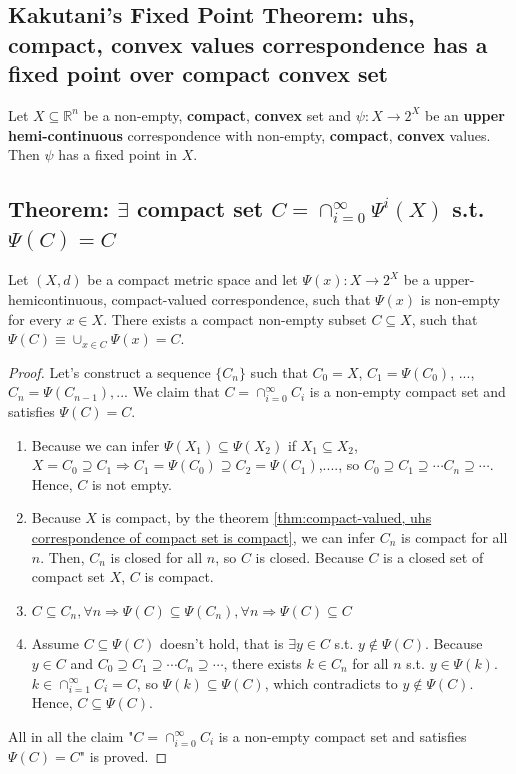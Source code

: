 \documentclass[11pt]{elegantbook}
\begin{document}
\subsection{Kakutani's Fixed Point Theorem: uhs, compact, convex values correspondence has a fixed point over compact convex set}
\begin{theorem}\label{thm:Kakutani's Fixed Point Theorem}
    Let $X \subseteq \mathbb{R}^n$ be a non-empty, \textbf{compact}, \textbf{convex} set and $\psi : X \rightarrow 2^X$ be an \textbf{upper hemi-continuous} correspondence with non-empty, \textbf{compact}, \textbf{convex} values. Then $\psi$ has a fixed point in $X$.
\end{theorem}


\subsection{Theorem: $\exists$ compact set $C = \cap_{i=0}^\infty \Psi^i(X)$ s.t. $\Psi(C)=C$}
\begin{theorem}
    Let $(X, d)$ be a compact metric space and let $\Psi(x) : X \rightarrow 2^X$ be a upper-hemicontinuous, compact-valued correspondence, such that $\Psi(x)$ is non-empty for every $x \in X$. There exists a compact non-empty subset $C\subseteq X$, such that $\Psi(C) \equiv \cup_{x\in C}\Psi(x) = C$.
\end{theorem}
\begin{proof}
    Let's construct a sequence $\{C_n\}$ such that $C_0=X$, $C_1=\Psi(C_0)$, ..., $C_n=\Psi(C_{n-1}),...$ We claim that $C=\cap_{i=0}^\infty C_i$ is a non-empty compact set and satisfies $\Psi(C)=C$.
    \begin{enumerate}
        \item Because we can infer $\Psi(X_1)\subseteq \Psi(X_2)$ if $X_1\subseteq X_2$, $X=C_0\supseteq C_1 \Rightarrow C_1=\Psi(C_0)\supseteq C_2=\Psi(C_1)$,...., so $C_0\supseteq C_1\supseteq \cdots C_n\supseteq \cdots$. Hence, $C$ is not empty.
        \item Because $X$ is compact, by the theorem \ref{thm:compact-valued, uhs correspondence of compact set is compact}, we can infer $C_n$ is compact for all $n$. Then, $C_n$ is closed for all $n$, so $C$ is closed. Because $C$ is a closed set of compact set $X$, $C$ is compact.
        \item $C\subseteq C_n,\forall n \Rightarrow \Psi(C)\subseteq \Psi(C_n),\forall n \Rightarrow \Psi(C)\subseteq C$
        \item Assume $C\subseteq \Psi(C)$ doesn't hold, that is $\exists y\in C$ s.t. $y\notin \Psi(C)$. Because $y\in C$ and $C_0\supseteq C_1\supseteq \cdots C_n\supseteq \cdots$, there exists $k\in C_n$ for all $n$ s.t. $y\in\Psi(k)$. $k\in \cap_{i=1}^\infty C_i=C$, so $\Psi(k)\subseteq \Psi(C)$, which contradicts to $y\notin \Psi(C)$. Hence, $C\subseteq \Psi(C)$.
    \end{enumerate}
    All in all the claim "$C=\cap_{i=0}^\infty C_i$ is a non-empty compact set and satisfies $\Psi(C)=C$" is proved.
\end{proof}
\end{document}
